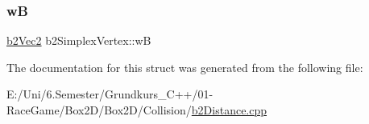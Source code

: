\subsubsection{\texorpdfstring{wB}{wB}}
{\footnotesize\ttfamily \mbox{\hyperlink{structb2_vec2}{b2\+Vec2}} b2\+Simplex\+Vertex\+::wB}



The documentation for this struct was generated from the following file\+:\begin{DoxyCompactItemize}
\item 
E\+:/\+Uni/6.\+Semester/\+Grundkurs\+\_\+\+C++/01-\/\+Race\+Game/\+Box2\+D/\+Box2\+D/\+Collision/\mbox{\hyperlink{b2_distance_8cpp}{b2\+Distance.\+cpp}}\end{DoxyCompactItemize}
